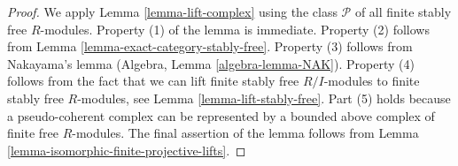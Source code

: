 \documentclass[10pt,a4paper]{amsart}
\theoremstyle{plain}
\theoremstyle{definition}
\theoremstyle{remark}
\numberwithin{equation}{subsection}
\begin{document}
\begin{proof}
We apply Lemma \ref{lemma-lift-complex} using the class $\mathcal{P}$
of all finite stably free $R$-modules. Property (1) of the lemma is immediate.
Property (2) follows from Lemma \ref{lemma-exact-category-stably-free}.
Property (3) follows from Nakayama's lemma
(Algebra, Lemma \ref{algebra-lemma-NAK}).
Property (4) follows from the fact that we can lift finite stably free
$R/I$-modules to finite stably free $R$-modules, see
Lemma \ref{lemma-lift-stably-free}.
Part (5) holds because a pseudo-coherent complex can be represented
by a bounded above complex of finite free $R$-modules.
The final assertion of the lemma follows from
Lemma \ref{lemma-isomorphic-finite-projective-lifts}.
\end{proof}
\end{document}
